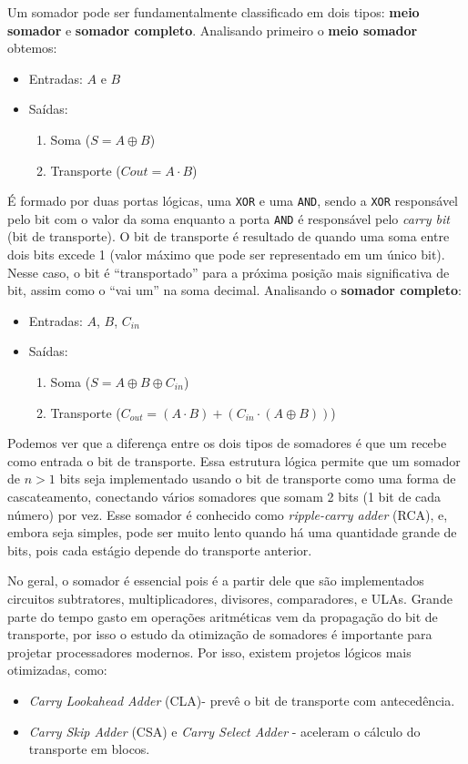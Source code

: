 \documentclass{article}
\begin{document}
Um somador pode ser fundamentalmente classificado em dois tipos: \textbf{meio somador} e \textbf{somador completo}. Analisando primeiro o \textbf{meio somador} obtemos:

\begin{itemize}
    \item Entradas: $A$ e $B$
    \item Saídas:
    \begin{enumerate}
        \item Soma ($S = A \oplus B$)
        \item Transporte ($Cout = A \cdot B$)
    \end{enumerate}
\end{itemize}

É formado por duas portas lógicas, uma \texttt{XOR} e uma \texttt{AND}, sendo a \texttt{XOR} responsável pelo bit com o valor da soma enquanto a porta \texttt{AND} é responsável pelo \textit{carry bit} (bit de transporte). O bit de transporte é resultado de quando uma soma entre dois bits excede 1 (valor máximo que pode ser representado em um único bit). Nesse caso, o bit é ``transportado'' para a próxima posição mais significativa de bit, assim como o ``vai um'' na soma decimal. Analisando o \textbf{somador completo}:

\begin{itemize}
    \item Entradas: $A$, $B$, $C_{in}$
    \item Saídas:
    \begin{enumerate}
        \item Soma ($S = A \oplus B \oplus C_{in}$)
        \item Transporte ($C_{out} = (A \cdot B) + (C_{in} \cdot (A \oplus B))$)
    \end{enumerate}
\end{itemize}

Podemos ver que a diferença entre os dois tipos de somadores é que um recebe como entrada o bit de transporte. Essa estrutura lógica permite que um somador de $n > 1$ bits seja implementado usando o bit de transporte como uma forma de cascateamento, conectando vários somadores que somam 2 bits (1 bit de cada número) por vez. Esse somador é conhecido como \textit{ripple-carry adder} (RCA), e, embora seja simples, pode ser muito lento quando há uma quantidade grande de bits, pois cada estágio depende do transporte anterior. 

No geral, o somador é essencial pois é a partir dele que são implementados circuitos subtratores, multiplicadores, divisores, comparadores, e ULAs. Grande parte do tempo gasto em operações aritméticas vem da propagação do bit de transporte, por isso o estudo da otimização de somadores é importante para projetar processadores modernos.
Por isso, existem projetos lógicos mais otimizadas, como:

\begin{itemize}
    \item \textit{Carry Lookahead Adder} (CLA)- prevê o bit de transporte com antecedência.
    \item \textit{Carry Skip Adder} (CSA) e \textit{Carry Select Adder} - aceleram o cálculo do transporte em blocos.
\end{itemize}
\end{document}
